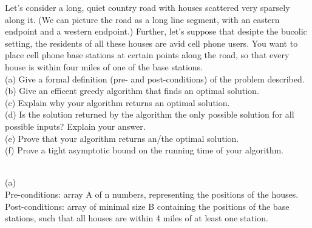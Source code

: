 \documentclass{assignment}
\begin{document}
\begin{problemlist}
\clearpage
\pbitem
\begin{problem}
Let's consider a long, quiet country road with houses scattered very sparsely along it. (We can picture the road as a long line segment, with an eastern endpoint and a western endpoint.) Further, let's suppose that desipte the bucolic setting, the residents of all these houses are avid cell phone users. You want to place cell phone base stations at certain points along the road, so that every house is within four miles of one of the base stations.\\
(a) Give a formal definition (pre- and post-conditions) of the problem described.\\
(b) Give an efficent greedy algorithm that finds an optimal solution.\\
(c) Explain why your algorithm returns an optimal solution.\\
(d) Is the solution returned by the algorithm the only possible solution for all possible inputs? Explain your answer.\\
(e) Prove that your algorithm returns an/the optimal solution.\\
(f) Prove a tight asymptotic bound on the running time of your algorithm.\\
\end{problem}
\begin{answer}
\\
(a) \\
Pre-conditions: array A of n numbers, representing the positions of the houses.\\
Post-conditions: array of minimal size B containing the positions of the base stations, such that all houses are within 4 miles of at least one station.\\


\end{answer}
\end{problemlist}
\end{document}
